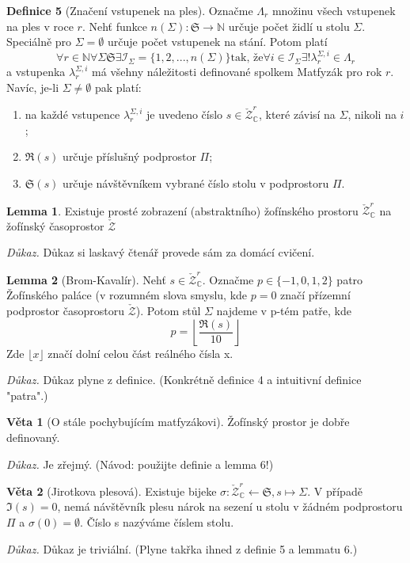 \documentclass[12pt,a4paper]{article}
\begin{document}
\textbf{Definice 5}
(Značení vstupenek na ples).
Označme $\Lambda_r$ množinu všech vstupenek na ples
v roce $r$. Nehť funkce $n(\Sigma) : \mathfrak{S} \rightarrow \mathds{N}$
určuje počet židlí u stolu $\Sigma$. Speciálně pro $\Sigma = \emptyset $
určuje počet vstupenek na stání. Potom platí
$$
\forall r \in \mathds{N} \forall \Sigma \mathfrak{S} \exists \mathcal{I}_{\Sigma} = \{1, 2,...,n(\Sigma)\} 
\text{tak, že} 
\forall i \in \mathcal{I}_\Sigma \exists! \lambda^{\Sigma, i}_r \in \Lambda_r
$$
a vstupenka $\lambda^{\Sigma, i}_r$ má všehny náležitosti definované spolkem Matfyzák pro rok $r$.
Navíc, je-li $\Sigma \neq \emptyset$ pak platí:
\begin{enumerate}
\item na každé vstupence $\lambda^{\Sigma, i}_r$
je uvedeno číslo $s \in \check{\mathcal{Z}}^r_\mathds{C}$, které závisí na $\Sigma$, nikoli na $i$;
\item $\Re(s)$ určuje příslušný podprostor $\Pi$;
\item $\mathfrak{S}(s)$ určuje návštěvníkem vybrané číslo stolu v podprostoru $\Pi$.
\end{enumerate}


\textbf{Lemma 1}. Existuje prosté zobrazení (abstraktního) žofínského prostoru
$\check{\mathcal{Z}}^r_{\mathds{C}}$ na žofínský časoprostor $\check{\mathcal{Z}}$
\par
\textit{Důkaz.}
Důkaz si laskavý čtenář provede sám za domácí cvičení.


\textbf{Lemma 2}
(Brom-Kavalír).
Nehť $s \in \check{\mathcal{Z}}^r_{\mathds{C}}$.
Označme $p \in \{-1, 0, 1, 2\}$ patro Žofínského
paláce (v rozumném slova smyslu, kde $p = 0$ značí přízemní podprostor časoprostoru $\check{\mathcal{Z}}$).
Potom stůl $\Sigma$ najdeme v p-tém patře, kde
$$
p =  \left\lfloor \frac{\Re (s)}{10} \right\rfloor
$$
Zde $\lfloor x \rfloor$ značí dolní celou část reálného čísla x.
\par
\textit{Důkaz.}
Důkaz plyne z definice. (Konkrétně definice 4 a intuitivní definice "patra".)


\textbf{Věta 1}
(O stále pochybujícím matfyzákovi).
Žofínský prostor je dobře definovaný.
\par
\textit{Důkaz.}
Je zřejmý. (Návod: použijte definie a lemma 6!)


\textbf{Věta 2}
(Jirotkova plesová).
Existuje bijeke $\sigma : \check{\mathcal{Z}}^r_{\mathds{C}} \leftarrow \mathfrak{S}, s \mapsto \Sigma$.
V případě $\Im(s) = 0$, nemá návštěvník plesu nárok na sezení u
stolu v žádném podprostoru $\Pi$ a $\sigma(0) = \emptyset$. Číslo s nazýváme číslem stolu.
\par
\textit{Důkaz.}
Důkaz je triviální. (Plyne takřka ihned z definie 5 a lemmatu 6.)
\end{document}
